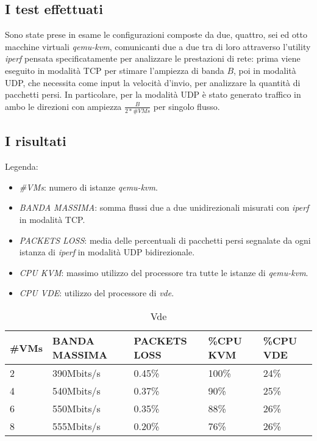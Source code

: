 \subsection{I test effettuati}
Sono state prese in esame le configurazioni composte da due, quattro, sei ed otto macchine virtuali {\em qemu-kvm}, comunicanti due a due tra di loro attraverso l'utility {\em iperf} pensata specificatamente per analizzare le prestazioni di rete: prima viene eseguito in modalità TCP per stimare l'ampiezza di banda $B$, poi in modalità UDP, che necessita come input la velocità d'invio, per analizzare la quantità di pacchetti persi. In particolare, per la modalità UDP è stato generato traffico in ambo le direzioni con ampiezza $ \frac{B}{2*\#VMs} $ per singolo flusso.
\subsection{I risultati}
Legenda:
\begin{itemize}
\item {\em \#VMs}: numero di istanze {\em qemu-kvm}.
\item {\em BANDA MASSIMA}: somma flussi due a due unidirezionali misurati con {\em iperf} in modalità TCP.
\item {\em PACKETS LOSS}: media delle percentuali di pacchetti persi segnalate da ogni istanza di {\em iperf} in modalità UDP bidirezionale.
\item {\em CPU KVM}: massimo utilizzo del processore tra tutte le istanze di {\em qemu-kvm}.
\item {\em CPU VDE}: utilizzo del processore di {\em vde}.
\end{itemize}
\begin{table}[h]
\begin{tabular}{|p{}|p{}|p{}|p{}|p{}|}
\hline
\#VMs    & BANDA MASSIMA       & PACKETS LOSS   & \%CPU KVM & \%CPU VDE \\
\hline
\hline
2       & 390Mbits/s         & 0.45\%   & 100\% & 24\% \\
\hline
4       & 540Mbits/s         & 0.37\%   & 90\% & 25\% \\
\hline
6       & 550Mbits/s         & 0.35\%  & 88\% & 26\% \\
\hline
8       & 555Mbits/s         & 0.20\%  & 76\% & 26\% \\
\hline
\end{tabular}
\caption{Vde}
\label{vde}
\end{table}
